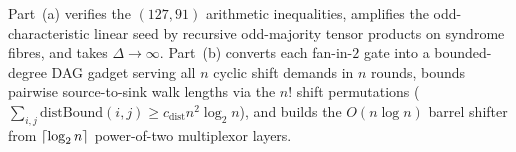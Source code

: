 \begin{outline}
Part~(a) verifies the $(127, 91)$ arithmetic inequalities, amplifies the odd-characteristic linear
seed by recursive odd-majority tensor products on syndrome fibres, and takes $\Delta \to \infty$.
Part~(b) converts each fan-in-$2$ gate into a bounded-degree DAG gadget serving all $n$ cyclic shift
demands in $n$ rounds, bounds pairwise source-to-sink walk lengths via the $n!$ shift permutations
($\sum_{i,j}\mathrm{distBound}(i,j) \ge c_{\mathrm{dist}} n^2\log_2 n$), and builds the
$O(n\log n)$ barrel shifter from $\lceil \log_2 n \rceil$ power-of-two multiplexor layers.
\end{outline}
